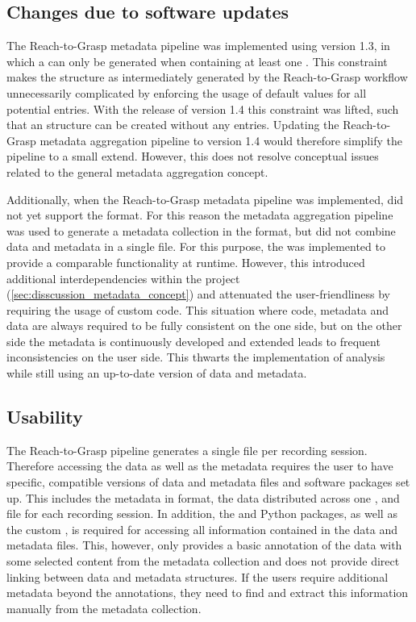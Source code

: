\subsection{Changes due to software updates}
The Reach-to-Grasp metadata pipeline was implemented using  version 1.3, in which a   can only be generated when containing at least one . This constraint makes the  structure as intermediately generated by the Reach-to-Grasp workflow unnecessarily complicated by enforcing the usage of default values for all potential  entries. With the release of  version 1.4 this constraint was lifted, such that an  structure can be created without any  entries. Updating the Reach-to-Grasp metadata aggregation pipeline to  version 1.4 would therefore simplify the pipeline to a small extend. However, this does not resolve conceptual issues related to the general metadata aggregation concept.

Additionally, when the Reach-to-Grasp metadata pipeline was implemented,  did not yet support the  format. For this reason the metadata aggregation pipeline was used to generate a metadata collection in the  format, but did not combine data and metadata in a single file. For this purpose, the  was implemented to provide a comparable functionality at runtime. However, this introduced additional interdependencies within the project (\cref{sec:disscussion_metadata_concept}) and attenuated the user-friendliness by requiring the usage of custom code. This situation where code, metadata and data are always required to be fully consistent on the one side, but on the other side the metadata is continuously developed and extended leads to frequent inconsistencies on the user side. This thwarts the implementation of analysis while still using an up-to-date version of data and metadata.


\subsection{Usability}
The Reach-to-Grasp pipeline generates a single  file per recording session. Therefore accessing the data as well as the metadata requires the user to have  specific, compatible versions of data and metadata files and software packages set up. This includes the metadata in  format, the data distributed across one ,  and  file for each recording session. In addition, the  and  Python packages, as well as the custom , is required for accessing all information contained in the data and metadata files. This, however, only provides a basic annotation of the data with some selected content from the metadata collection and does not provide direct linking between data and metadata structures. If the users require additional metadata beyond the annotations, they need to find and extract this information manually from the metadata collection.

